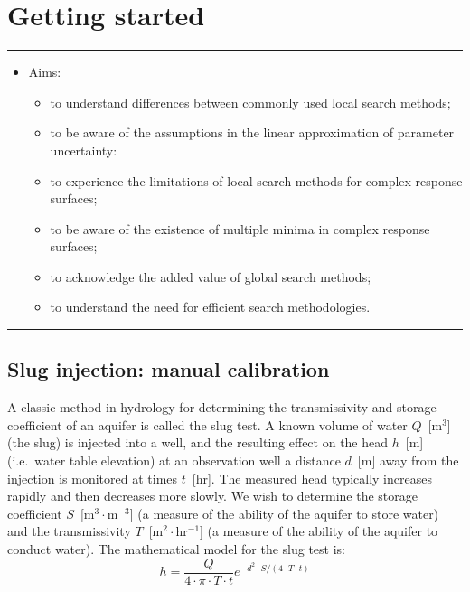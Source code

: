 \chapter{Getting started}
\thispagestyle{fancy}
\label{ch:getting-started}



\hrule
\begin{itemize}
\footnotesize
\item[]{Aims:}
\begin{itemize}
\item{to understand differences between commonly used local search methods;}
\item{to be aware of the assumptions in the linear approximation of parameter
uncertainty:}
\item{to experience the limitations of local search methods for complex response
surfaces;}
\item{to be aware of the existence of multiple minima in complex response
surfaces;}
\item{to acknowledge the added value of global search methods;}
\item{to understand the need for efficient search methodologies.}
\end{itemize}
\end{itemize}
\hrule
\vspace{1em}

\section{Slug injection: manual calibration}

A classic method in hydrology for determining the transmissivity and storage
coefficient of an aquifer is called the slug test. A known volume of water
$Q$~[\textsf{m$^3$}] (the slug) is injected into a well, and the resulting
effect on the head $h$~[\textsf{m}] (i.e.~water table elevation) at an
observation well a distance $d$~[\textsf{m}] away from the injection is
monitored at times $t$~[\textsf{hr}]. The measured head typically increases
rapidly and then decreases more slowly. We wish to determine the storage
coefficient $S$~[\textsf{m$^3\cdot{}$m$^{-3}$}] (a measure of the ability of the
aquifer to store water) and the transmissivity
$T$~[\textsf{m$^2\cdot{}$hr$^{-1}$}] (a measure of the ability of the aquifer to
conduct water). The mathematical model for the slug test is:
\begin{equation}
\label{eq:slug-inj}
h=\frac{Q}{4\cdot{}\pi\cdot{}T\cdot{}t}e^{-d^2\cdot{}S/(4\cdot{}T\cdot{}t)}
\end{equation}



